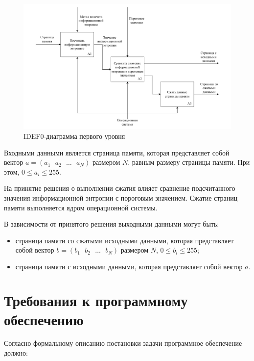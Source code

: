 \begin{figure}[H]
	\begin{center}
		\includegraphics[scale=0.7]{inc/img/first-level.pdf}
	\end{center}
	\captionsetup{justification=centering}
	\caption{IDEF0-диаграмма первого уровня}
	\label{img:first-level}
\end{figure}

Входными данными является страница памяти, которая представляет собой вектор $a = (a_1\text{ }a_2\text{ }\dotso\text{ }a_N)$ размером $N$, равным размеру страницы памяти. При этом, $0 \leq a_i \leq 255$.

На принятие решения о выполнении сжатия влияет сравнение подсчитанного значения информационной энтропии с пороговым значением. Сжатие страниц памяти выполняется ядром операционной системы.

В зависимости от принятого решения выходными данными могут быть:
\begin{itemize}
	\item страница памяти со сжатыми исходными данными, которая представляет собой вектор $b = (b_1\text{ }b_2\text{ }\dotso\text{ }b_N)$ размером $N$, $0 \leq b_i \leq 255$;
    \item страница памяти с исходными данными, которая представляет собой вектор $a$.
\end{itemize}

\section{Требования к программному обеспечению}

Согласно формальному описанию постановки задачи программное обеспечение должно:

